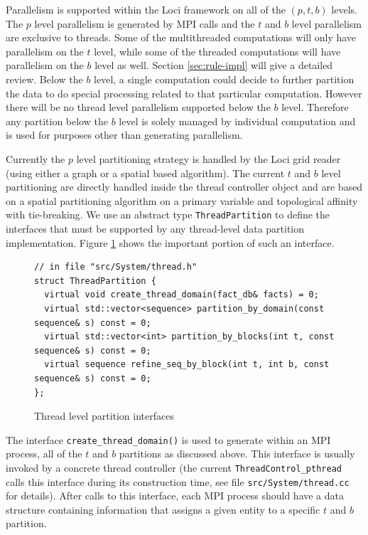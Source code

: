\documentclass{article}
\begin{document}
Parallelism is supported within the Loci framework on all of the
$(p,t,b)$ levels.  The $p$ level parallelism is generated by MPI calls
and the $t$ and $b$ level parallelism are exclusive to threads.  Some of
the multithreaded computations will only have parallelism on the $t$
level, while some of the threaded computations will have parallelism on
the $b$ level as well.  Section \ref{sec:rule-impl} will give a detailed
review.  Below the $b$ level, a single computation could decide to
further partition the data to do special processing related to that
particular computation.  However there will be no thread level
parallelism supported below the $b$ level.  Therefore any partition
below the $b$ level is solely managed by individual computation and is
used for purposes other than generating parallelism.

Currently the $p$ level partitioning strategy is handled by the Loci
grid reader (using either a graph or a spatial based algorithm).  The
current $t$ and $b$ level partitioning are directly handled inside the
thread controller object and are based on a spatial partitioning
algorithm on a primary variable and topological affinity with
tie-breaking.  We use an abstract type \lstinline{ThreadPartition} to
define the interfaces that must be supported by any thread-level data
partition implementation.  Figure \ref{fig:tp} shows the important
portion of such an interface.

\begin{figure}[h]
  \begin{lstlisting}
// in file "src/System/thread.h"
struct ThreadPartition {
  virtual void create_thread_domain(fact_db& facts) = 0;
  virtual std::vector<sequence> partition_by_domain(const sequence& s) const = 0;
  virtual std::vector<int> partition_by_blocks(int t, const sequence& s) const = 0;
  virtual sequence refine_seq_by_block(int t, int b, const sequence& s) const = 0;
};
  \end{lstlisting}
  \caption{Thread level partition interfaces\label{fig:tp}}
\end{figure}

The interface \lstinline{create_thread_domain()} is used to generate
within an MPI process, all of the $t$ and $b$ partitions as discussed
above.  This interface is usually invoked by a concrete thread
controller (the current \lstinline{ThreadControl_pthread} calls this
interface during its construction time, see file
\texttt{src/System/thread.cc} for details).  After calls to this
interface, each MPI process should have a data structure containing
information that assigns a given entity to a specific $t$ and $b$
partition.
\end{document}
